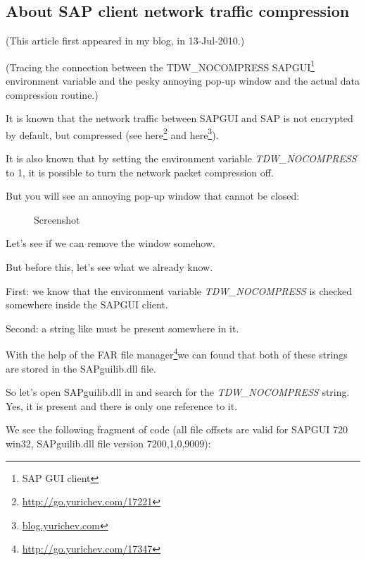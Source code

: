\subsection{About SAP client network traffic compression}
\label{sec:SAPGUI}

(This article first appeared in my blog, in 13-Jul-2010.)

\newcommand{\TDWNC}{TDW\_NOCOMPRESS\xspace}

(Tracing the connection between the \TDWNC{}
SAPGUI\footnote{SAP GUI client} environment variable and 
the pesky annoying pop-up window and the actual data compression routine.)
 
It is known that the network traffic between SAPGUI and SAP is not encrypted by default, but compressed
(see here\footnote{\url{http://go.yurichev.com/17221}} 
and here\footnote{\href{http://go.yurichev.com/17225}{blog.yurichev.com}}). 

It is also known that by setting the environment variable \emph{\TDWNC} to 1, it is possible to turn the network packet compression off.

But you will see an annoying pop-up window that cannot be closed:

\begin{figure}[H]
\centering
{}
\caption{Screenshot}
\end{figure}

Let's see if we can remove the window somehow.

But before this, let's see what we already know.

First: we know that the environment variable \emph{\TDWNC} is checked somewhere inside the SAPGUI client.

Second: a string like  must be present somewhere in it.
\newcommand{\FNURLFAR}{\footnote{\url{http://go.yurichev.com/17347}}}

With the help of the FAR file manager\FNURLFAR we can found that both of these strings are stored in the SAPguilib.dll file.

So let's open SAPguilib.dll in \IDA and search for the \emph{\TDWNC} string. 
Yes, it is present and there is only one reference to it.

We see the following fragment of code 
(all file offsets are valid for SAPGUI 720 win32, SAPguilib.dll file version 7200,1,0,9009):



